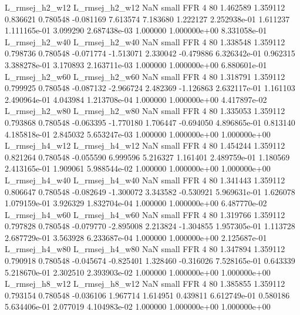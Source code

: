 L_rmsej_h2_w12 L_rmsej_h2_w12                   NaN      small      FFR                 4 80 1.462589       1.359112 0.836621       0.780548   -0.081169      7.613574      7.183680     1.222127   2.252938e-01  1.611237 1.111165e-01     3.099290   2.687438e-03            1.000000    1.000000e+00        8.331058e-01
L_rmsej_h2_w40 L_rmsej_h2_w40                   NaN      small      FFR                 4 80 1.338548       1.359112 0.798736       0.780548   -0.071774     -1.513071      2.330042    -0.479886   6.326342e-01  0.962315 3.388278e-01     3.170893   2.163711e-03            1.000000    1.000000e+00        6.880601e-01
L_rmsej_h2_w60 L_rmsej_h2_w60                   NaN      small      FFR                 4 80 1.318791       1.359112 0.799925       0.780548   -0.087132     -2.966724      2.482369    -1.126863   2.632117e-01  1.161103 2.490964e-01     4.043984   1.213708e-04            1.000000    1.000000e+00        4.417897e-02
L_rmsej_h2_w80 L_rmsej_h2_w80                   NaN      small      FFR                 4 80 1.335053       1.359112 0.793868       0.780548   -0.063395     -1.770180      1.706447    -0.694050   4.896865e-01  0.813140 4.185818e-01     2.845032   5.653247e-03            1.000000    1.000000e+00        1.000000e+00
L_rmsej_h4_w12 L_rmsej_h4_w12                   NaN      small      FFR                 4 80 1.454244       1.359112 0.821264       0.780548   -0.055590      6.999596      5.216327     1.161401   2.489759e-01  1.180569 2.413165e-01     1.909061   5.988544e-02            1.000000    1.000000e+00        1.000000e+00
L_rmsej_h4_w40 L_rmsej_h4_w40                   NaN      small      FFR                 4 80 1.341443       1.359112 0.806647       0.780548   -0.082649     -1.300072      3.343582    -0.530921   5.969631e-01  1.626078 1.079159e-01     3.926329   1.832704e-04            1.000000    1.000000e+00        6.487770e-02
L_rmsej_h4_w60 L_rmsej_h4_w60                   NaN      small      FFR                 4 80 1.319766       1.359112 0.797828       0.780548   -0.079770     -2.895008      2.213824    -1.304855   1.957305e-01  1.113728 2.687729e-01     3.563928   6.233687e-04            1.000000    1.000000e+00        2.125687e-01
L_rmsej_h4_w80 L_rmsej_h4_w80                   NaN      small      FFR                 4 80 1.347894       1.359112 0.790918       0.780548   -0.045674     -0.825401      1.328460    -0.316026   7.528165e-01  0.643339 5.218670e-01     2.302510   2.393903e-02            1.000000    1.000000e+00        1.000000e+00
L_rmsej_h8_w12 L_rmsej_h8_w12                   NaN      small      FFR                 4 80 1.385855       1.359112 0.793154       0.780548   -0.036106      1.967714      1.614951     0.439811   6.612749e-01  0.580186 5.634406e-01     2.077019   4.104983e-02            1.000000    1.000000e+00        1.000000e+00
